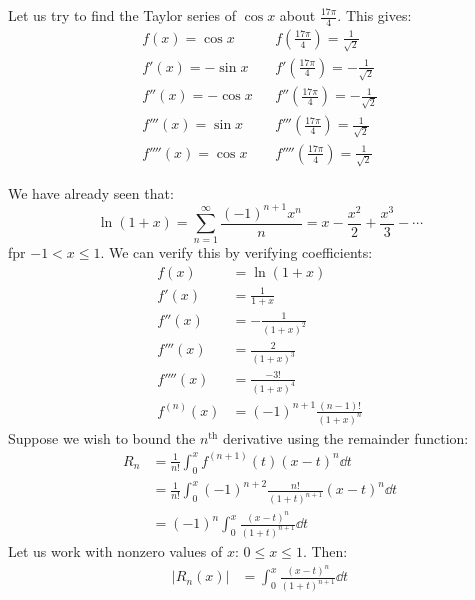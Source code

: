 \begin{itemize}
\begin{example}
        Let us try to find the Taylor series of $\cos x$ about $\frac{17 \pi}{4}$. This gives:
        \begin{align}
            f(x)=\cos x && f\left(\frac{17\pi}{4}\right) = \frac{1}{\sqrt{2}} \\ 
            f'(x)=-\sin x && f'\left(\frac{17\pi}{4}\right) = -\frac{1}{\sqrt{2}} \\ 
            f''(x)=-\cos x && f''\left(\frac{17\pi}{4}\right) = -\frac{1}{\sqrt{2}} \\ 
            f'''(x)=\sin x && f'''\left(\frac{17\pi}{4}\right) = \frac{1}{\sqrt{2}} \\ 
            f''''(x)=\cos x && f''''\left(\frac{17\pi}{4}\right) = \frac{1}{\sqrt{2}}
        \end{align}
    \end{example}
    \begin{example}
        We have already seen that:
        \begin{equation}
            \ln(1+x)=\sum_{n=1}^\infty \frac{(-1)^{n+1}x^n}{n} = x - \frac{x^2}{2} + \frac{x^3}{3} - \cdots
        \end{equation}
        fpr $-1<x \le 1$. We can verify this by verifying coefficients:
        \begin{align}
            f(x) &= \ln(1+x) \\ 
            f'(x) &= \frac{1}{1+x} \\ 
            f''(x) &= -\frac{1}{(1+x)^2} \\ 
            f'''(x) &= \frac{2}{(1+x)^3} \\ 
            f''''(x) &= \frac{-3!}{(1+x)^4} \\ 
            f^{(n)}(x) &= (-1)^{n+1} \frac{(n-1)!}{(1+x)^n}
        \end{align}
        Suppose we wish to bound the $n^\text{th}$ derivative using the remainder function:
        \begin{align}
            R_n &= \frac{1}{n!}\int_0^x f^{(n+1)}(t)(x-t)^n \dd{t} \\ 
            &= \frac{1}{n!}\int_0^x (-1)^{n+2} \frac{n!}{(1+t)^{n+1}}(x-t)^n \dd{t} \\ 
            &= (-1)^n \int_0^x \frac{(x-t)^n}{(1+t)^{n+1}}\dd{t}
        \end{align}
        Let us work with nonzero values of $x$: $0 \le x \le 1$. Then:
        \begin{align}
            |R_n(x)| &= \int_0^x \frac{(x-t)^n}{(1+t)^{n+1}} \dd{t} \\ 

\end{align}
\end{example}
\end{itemize}
